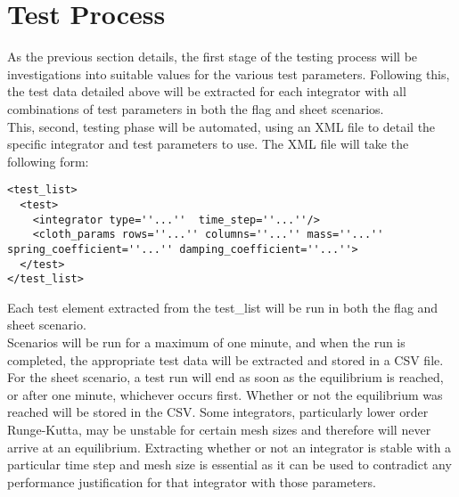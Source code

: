 \section{Test Process}
As the previous section details, the first stage of the testing process will be investigations into suitable values for the various test parameters. Following this, the test data detailed above will be extracted for each integrator with all combinations of test parameters in both the flag and sheet scenarios.
\\This, second, testing phase will be automated, using an XML file to detail the specific integrator and test parameters to use. The XML file will take the following form:
\begin{lstlisting}
<test_list>
  <test>
    <integrator type=''...''  time_step=''...''/>
    <cloth_params rows=''...'' columns=''...'' mass=''...'' spring_coefficient=''...'' damping_coefficient=''...''>
  </test>
</test_list>
\end{lstlisting}
Each test element extracted from the test\_list will be run in both the flag and sheet scenario.
\\Scenarios will be run for a maximum of one minute, and when the run is completed, the appropriate test data will be extracted and stored in a CSV file. 
\\For the sheet scenario, a test run will end as soon as the equilibrium is reached, or after one minute, whichever occurs first. Whether or not the equilibrium was reached will be stored in the CSV. Some integrators, particularly lower order Runge-Kutta, may be unstable for certain mesh sizes and therefore will never arrive at an equilibrium. Extracting whether or not an integrator is stable with a particular time step and mesh size is essential as it can be used to contradict any performance justification for that integrator with those parameters.